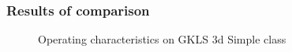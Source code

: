 \documentclass[aspectratio=1610]{beamer}
\begin{document}
\begin{frame}
  \frametitle{Results of comparison}
  \begin{figure}[ht]
    \hspace*{-0.9cm}
    \caption{Operating characteristics on GKLS 3d Simple class}
  \end{figure}
\end{frame}
\end{document}
